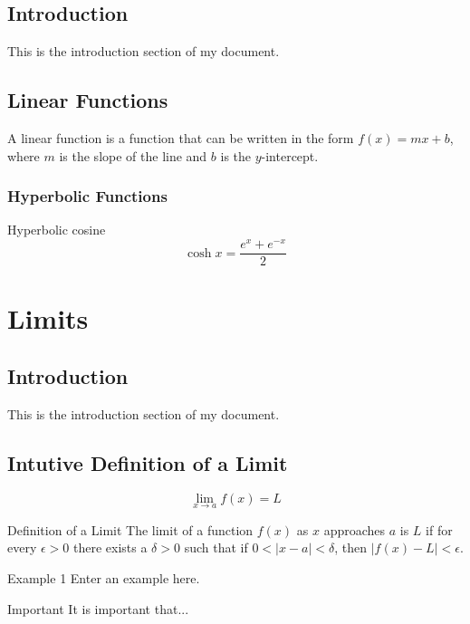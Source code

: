 \documentclass{book}
\begin{document}
\section{Introduction}
This is the introduction section of my document.
\section{Linear Functions}
A linear function is a function that can be written in the form $f(x) = mx + b$, where $m$ is the slope of the line and $b$ is the $y$-intercept.

\subsection{Hyperbolic Functions}

Hyperbolic cosine 
\begin{equation}
	\cosh x = \frac{e^x + e^{-x}}{2}
\end{equation}



\chapter{Limits}
\section{Introduction}
This is the introduction section of my document.
\section{Intutive Definition of a Limit}

\begin{equation} 
    \lim_{x \to a} f(x) = L
\end{equation}

\begin{definition}
    {Definition of a Limit}
    The limit of a function $f(x)$ as $x$ approaches $a$ is $L$ if for every $\epsilon > 0$ there exists a $\delta > 0$ such that if $0 < |x - a| < \delta$, then $|f(x) - L| < \epsilon$.
\end{definition}

\begin{example}
    {Example 1}
  Enter an example here. 
\end{example}

\begin{important} 
    {Important} It is important that... 
\end{important}
\end{document}
